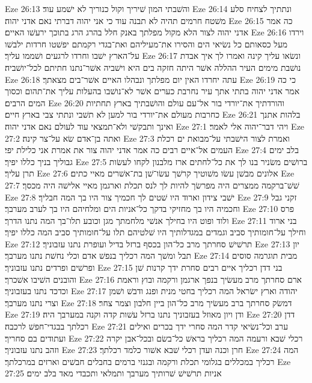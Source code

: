 Eze 26:13  והשׁבתי המון שׁיריך וקול כנוריך לא ישׁמע עוד׃
Eze 26:14  ונתתיך לצחיח סלע משׁטח חרמים תהיה לא תבנה עוד כי אני יהוה דברתי נאם אדני יהוה׃
Eze 26:15  כה אמר אדני יהוה לצור הלא מקול מפלתך באנק חלל בהרג הרג בתוכך ירעשׁו האיים׃
Eze 26:16  וירדו מעל כסאותם כל נשׂיאי הים והסירו את־מעיליהם ואת־בגדי רקמתם יפשׁטו חרדות ילבשׁו על־הארץ ישׁבו וחרדו לרגעים ושׁממו עליך׃
Eze 26:17  ונשׂאו עליך קינה ואמרו לך איך אבדת נושׁבת מימים העיר ההללה אשׁר היתה חזקה בים היא וישׁביה אשׁר־נתנו חתיתם לכל־יושׁביה׃
Eze 26:18  עתה יחרדו האין יום מפלתך ונבהלו האיים אשׁר־בים מצאתך׃
Eze 26:19  כי כה אמר אדני יהוה בתתי אתך עיר נחרבת כערים אשׁר לא־נושׁבו בהעלות עליך את־תהום וכסוך המים הרבים׃
Eze 26:20  והורדתיך את־יורדי בור אל־עם עולם והושׁבתיך בארץ תחתיות כחרבות מעולם את־יורדי בור למען לא תשׁבי ונתתי צבי בארץ חיים׃
Eze 26:21  בלהות אתנך ואינך ותבקשׁי ולא־תמצאי עוד לעולם נאם אדני יהוה׃
Eze 27:1  ויהי דבר־יהוה אלי לאמר׃
Eze 27:2  ואתה בן־אדם שׂא על־צר קינה׃
Eze 27:3  ואמרת לצור הישׁבתי על־מבואת ים רכלת העמים אל־איים רבים כה אמר אדני יהוה צור את אמרת אני כלילת יפי׃
Eze 27:4  בלב ימים גבוליך בניך כללו יפיך׃
Eze 27:5  ברושׁים משׂניר בנו לך את כל־לחתים ארז מלבנון לקחו לעשׂות תרן עליך׃
Eze 27:6  אלונים מבשׁן עשׂו משׁוטיך קרשׁך עשׂו־שׁן בת־אשׁרים מאיי כתים׃
Eze 27:7  שׁשׁ־ברקמה ממצרים היה מפרשׂך להיות לך לנס תכלת וארגמן מאיי אלישׁה היה מכסך׃
Eze 27:8  ישׁבי צידון וארוד היו שׁטים לך חכמיך צור היו בך המה חבליך׃
Eze 27:9  זקני גבל וחכמיה היו בך מחזיקי בדקך כל־אניות הים ומלחיהם היו בך לערב מערבך׃
Eze 27:10  פרס ולוד ופוט היו בחילך אנשׁי מלחמתך מגן וכובע תלו־בך המה נתנו הדרך׃
Eze 27:11  בני ארוד וחילך על־חומותיך סביב וגמדים במגדלותיך היו שׁלטיהם תלו על־חומותיך סביב המה כללו יפיך׃
Eze 27:12  תרשׁישׁ סחרתך מרב כל־הון בכסף ברזל בדיל ועופרת נתנו עזבוניך׃
Eze 27:13  יון תבל ומשׁך המה רכליך בנפשׁ אדם וכלי נחשׁת נתנו מערבך׃
Eze 27:14  מבית תוגרמה סוסים ופרשׁים ופרדים נתנו עזבוניך׃
Eze 27:15  בני דדן רכליך איים רבים סחרת ידך קרנות שׁן והובנים השׁיבו אשׁכרך׃
Eze 27:16  ארם סחרתך מרב מעשׂיך בנפך ארגמן ורקמה ובוץ וראמת וכדכד נתנו בעזבוניך׃
Eze 27:17  יהודה וארץ ישׂראל המה רכליך בחטי מנית ופנג ודבשׁ ושׁמן וצרי נתנו מערבך׃
Eze 27:18  דמשׂק סחרתך ברב מעשׂיך מרב כל־הון ביין חלבון וצמר צחר׃
Eze 27:19  ודן ויון מאוזל בעזבוניך נתנו ברזל עשׁות קדה וקנה במערבך היה׃
Eze 27:20  דדן רכלתך בבגדי־חפשׁ לרכבה׃
Eze 27:21  ערב וכל־נשׂיאי קדר המה סחרי ידך בכרים ואילים ועתודים בם סחריך׃
Eze 27:22  רכלי שׁבא ורעמה המה רכליך בראשׁ כל־בשׂם ובכל־אבן יקרה וזהב נתנו עזבוניך׃
Eze 27:23  חרן וכנה ועדן רכלי שׁבא אשׁור כלמד רכלתך׃
Eze 27:24  המה רכליך במכללים בגלומי תכלת ורקמה ובגנזי ברמים בחבלים חבשׁים וארזים במרכלתך׃
Eze 27:25  אניות תרשׁישׁ שׁרותיך מערבך ותמלאי ותכבדי מאד בלב ימים׃
